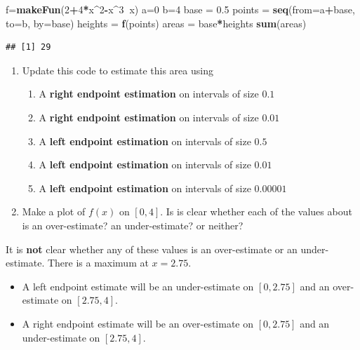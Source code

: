 \documentclass[
]{book}
\newenvironment{Shaded}{\begin{snugshade}}{\end{snugshade}}
\newcommand{\DataTypeTok}[1]{\textcolor[rgb]{0.13,0.29,0.53}{#1}}
\newcommand{\DecValTok}[1]{\textcolor[rgb]{0.00,0.00,0.81}{#1}}
\newcommand{\FloatTok}[1]{\textcolor[rgb]{0.00,0.00,0.81}{#1}}
\newcommand{\KeywordTok}[1]{\textcolor[rgb]{0.13,0.29,0.53}{\textbf{#1}}}
\newcommand{\NormalTok}[1]{#1}
\newcommand{\OperatorTok}[1]{\textcolor[rgb]{0.81,0.36,0.00}{\textbf{#1}}}
\newcommand{\StringTok}[1]{\textcolor[rgb]{0.31,0.60,0.02}{#1}}
\providecommand{\tightlist}{%
  \setlength{\itemsep}{0pt}\setlength{\parskip}{0pt}}
\begin{document}
\begin{Shaded}
\begin{Highlighting}[]
\NormalTok{f=}\KeywordTok{makeFun}\NormalTok{(}\DecValTok{2}\OperatorTok{+}\DecValTok{4}\OperatorTok{*}\NormalTok{x}\OperatorTok{^}\DecValTok{2}\OperatorTok{-}\NormalTok{x}\OperatorTok{^}\DecValTok{3}\OperatorTok{~}\NormalTok{x)}
\NormalTok{a=}\DecValTok{0}
\NormalTok{b=}\DecValTok{4}
\NormalTok{base =}\StringTok{ }\FloatTok{0.5}
\NormalTok{points =}\StringTok{ }\KeywordTok{seq}\NormalTok{(}\DataTypeTok{from=}\NormalTok{a}\OperatorTok{+}\NormalTok{base, }\DataTypeTok{to=}\NormalTok{b, }\DataTypeTok{by=}\NormalTok{base)}
\NormalTok{heights =}\StringTok{ }\KeywordTok{f}\NormalTok{(points)}
\NormalTok{areas =}\StringTok{ }\NormalTok{base}\OperatorTok{*}\NormalTok{heights}
\KeywordTok{sum}\NormalTok{(areas)}
\end{Highlighting}
\end{Shaded}

\begin{verbatim}
## [1] 29
\end{verbatim}

\begin{enumerate}
\def\labelenumi{\arabic{enumi}.}
\tightlist
\item
  Update this code to estimate this area using

  \begin{enumerate}
  \def\labelenumii{\alph{enumii}.}
  \tightlist
  \item
    A \textbf{right endpoint estimation} on intervals of size \(0.1\)
  \item
    A \textbf{right endpoint estimation} on intervals of size \(0.01\)
  \item
    A \textbf{left endpoint estimation} on intervals of size \(0.5\)
  \item
    A \textbf{left endpoint estimation} on intervals of size \(0.01\)
  \item
    A \textbf{left endpoint estimation} on intervals of size \(0.00001\)
  \end{enumerate}
\item
  Make a plot of \(f(x)\) on \([0,4]\). Is is clear whether each of the values about is an over-estimate? an under-estimate? or neither?
\end{enumerate}

It is \textbf{not} clear whether any of these values is an over-estimate or an under-estimate. There is a maximum at \(x=2.75\).

\begin{itemize}
\tightlist
\item
  A left endpoint estimate will be an under-estimate on \([0,2.75]\) and an over-estimate on \([2.75,4]\).
\item
  A right endpoint estimate will be an over-estimate on \([0,2.75]\) and an under-estimate on \([2.75,4]\).
\end{itemize}
\end{document}
